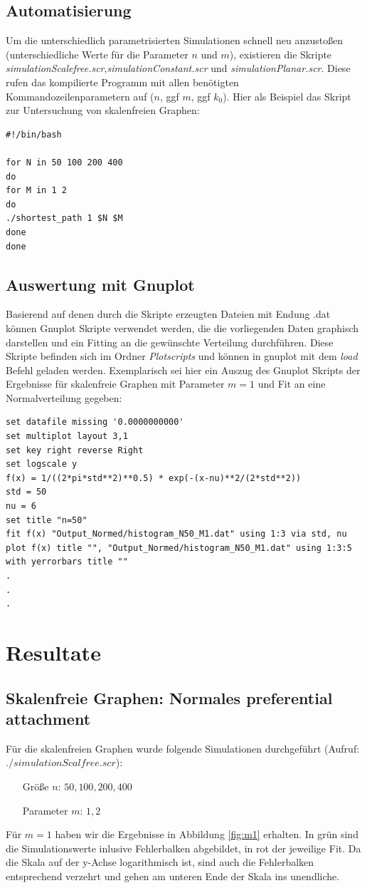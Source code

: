 \documentclass[10pt]{article}
\begin{document}
\subsection{Automatisierung}
Um die unterschiedlich parametrisierten Simulationen schnell neu anzustoßen (unterschiedliche Werte für die Parameter $n$ und $m$), existieren die Skripte \textit{simulationScalefree.scr},\textit{simulationConstant.scr} und \textit{simulationPlanar.scr}. Diese rufen das kompilierte Programm mit allen benötigten Kommandozeilenparametern auf ($n$, ggf $m$, ggf $k_0$). Hier als Beispiel das Skript zur Untersuchung von skalenfreien Graphen:

\begin{lstlisting}
#!/bin/bash

for N in 50 100 200 400
do
for M in 1 2
do
./shortest_path 1 $N $M
done
done
\end{lstlisting}

\subsection{Auswertung mit Gnuplot}
Basierend auf denen durch die Skripte erzeugten Dateien mit Endung .dat können Gnuplot Skripte verwendet werden, die die vorliegenden Daten graphisch darstellen und ein Fitting an die gewünschte Verteilung durchführen. Diese Skripte befinden sich im Ordner \textit{Plotscripts} und können in gnuplot mit dem \textit{load} Befehl geladen werden. Exemplarisch sei hier ein Auszug des Gnuplot Skripts der Ergebnisse für skalenfreie Graphen mit Parameter $m=1$ und Fit an eine Normalverteilung gegeben:
\begin{lstlisting}
set datafile missing '0.0000000000'
set multiplot layout 3,1
set key right reverse Right
set logscale y
f(x) = 1/((2*pi*std**2)**0.5) * exp(-(x-nu)**2/(2*std**2))
std = 50
nu = 6
set title "n=50"
fit f(x) "Output_Normed/histogram_N50_M1.dat" using 1:3 via std, nu
plot f(x) title "", "Output_Normed/histogram_N50_M1.dat" using 1:3:5 with yerrorbars title ""
.
.
.
\end{lstlisting}

\section{Resultate}
\subsection{Skalenfreie Graphen: Normales preferential attachment}
Für die skalenfreien Graphen wurde folgende Simulationen durchgeführt (Aufruf: $./simulationScalfree.scr$): 
\begin{itemize}
\item[\quad Größe $n$:] $50,100,200,400$
\item[\quad Parameter $m$:] $1,2$
\end{itemize}
Für $m=1$ haben wir die Ergebnisse in Abbildung \ref{fig:m1} erhalten. In grün sind die Simulationswerte inlusive Fehlerbalken abgebildet, in rot der jeweilige Fit. Da die Skala auf der y-Achse logarithmisch ist, sind auch die Fehlerbalken entsprechend verzehrt und gehen am unteren Ende der Skala ins unendliche. 
\end{document}
